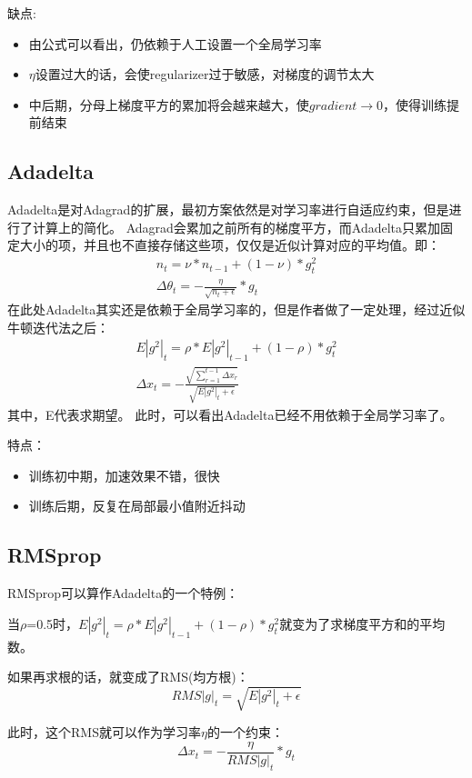 缺点:
\begin{itemize}
\item 由公式可以看出，仍依赖于人工设置一个全局学习率
\item $\eta$设置过大的话，会使regularizer过于敏感，对梯度的调节太大
\item 中后期，分母上梯度平方的累加将会越来越大，使$gradient\to0$，使得训练提前结束
\end{itemize}

\subsection{Adadelta}
Adadelta是对Adagrad的扩展，最初方案依然是对学习率进行自适应约束，但是进行了计算上的简化。 Adagrad会累加之前所有的梯度平方，而Adadelta只累加固定大小的项，并且也不直接存储这些项，仅仅是近似计算对应的平均值。即：
\begin{eqnarray*}
n_t=\nu*n_{t-1}+(1-\nu)*g_t^2  \\
\Delta{\theta_t} = -\frac{\eta}{\sqrt{n_t+\epsilon}}*g_t
\end{eqnarray*}
在此处Adadelta其实还是依赖于全局学习率的，但是作者做了一定处理，经过近似牛顿迭代法之后：
\begin{eqnarray*}
E|g^2|_t=\rho*E|g^2|_{t-1}+(1-\rho)*g_t^2  \\
\Delta{x_t}=-\frac{\sqrt{\sum_{r=1}^{t-1}\Delta{x_r}}}{\sqrt{E|g^2|_t+\epsilon}}
\end{eqnarray*}
其中，E代表求期望。
此时，可以看出Adadelta已经不用依赖于全局学习率了。

特点：
\begin{itemize}
\item 训练初中期，加速效果不错，很快
\item 训练后期，反复在局部最小值附近抖动
\end{itemize}

\subsection{RMSprop}
RMSprop可以算作Adadelta的一个特例：

当$\rho$=0.5时，$E|g^2|_t=\rho*E|g^2|_{t-1}+(1-\rho)*g_t^2$就变为了求梯度平方和的平均数。

如果再求根的话，就变成了RMS(均方根)：
\begin{displaymath}
RMS|g|_t=\sqrt{E|g^2|_t+\epsilon}
\end{displaymath}

此时，这个RMS就可以作为学习率$\eta$的一个约束：
\begin{displaymath}
\Delta{x_t}=-\frac{\eta}{RMS|g|_t}*g_t
\end{displaymath}

